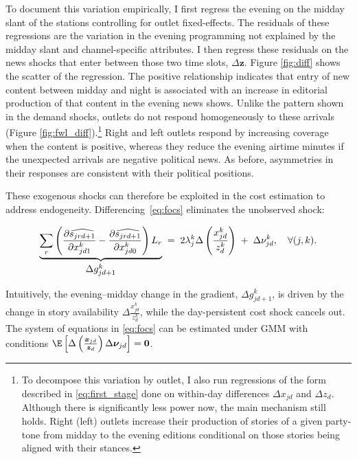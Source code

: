 \documentclass[12pt]{article}
\begin{document}
To document this variation empirically, I first regress the evening on the midday slant of the stations controlling for outlet fixed-effects. The residuals of these regressions are the  variation in the evening programming not explained by the midday slant and channel-specific attributes. I then regress these residuals on the news shocks  that enter between those two time slots, $\Delta \bm{z}$. Figure \ref{fig:diff} shows the scatter of the regression.  The positive relationship indicates that entry of new content between midday and night is associated with an increase in editorial production of that content in the evening news shows. Unlike the pattern shown in the demand shocks,  outlets do not respond homogeneously to these arrivals (Figure \ref{fig:fwl_diff}).\footnote{To decompose this variation by outlet, I also run regressions of the form described in  \eqref{eq:first_stage} done on within-day differences $ \Delta x_{jd}$ and $\Delta z_{d}$. Although there is significantly less power now, the main mechanism still holds. Right (left) outlets increase  their production of stories of a given party-tone from midday to the evening editions conditional on those stories being aligned with their stances.} Right and left  outlets respond by increasing coverage when the content is positive, whereas they reduce the evening airtime minutes if the unexpected arrivals are negative political news. As before, asymmetries in their responses are consistent with their political positions. 


These exogenous shocks can therefore be exploited in the cost estimation to address endogeneity. Differencing~\eqref{eq:focs} eliminates the unobserved shock:

\begin{equation}\label{eq:diff_foc}
	\underbrace{%
		\sum_{r}\left(
		\frac{\partial \widehat{s_{jrd+1}}}{\partial x_{jd1}^k}
		-
		\frac{\partial \widehat{s_{jrd+1}}}{\partial x_{jd0}^k}
		\right)L_r
	}_{\textstyle \Delta g_{jd+1}^k}
	\;=\;
	2\lambda_j^k
\Delta\left( \frac{x_{jd}^k }{z_{d}^k } \right)
	\;+\;
	\Delta\nu_{jd}^k,
	\quad \forall (j,k).
\end{equation}



 Intuitively, the evening–midday change in the gradient, $\Delta g_{jd+1}^k$, is driven by the change in story availability $\Delta	
\frac{x_{jd}^k }{z_{d}^k }$, while the day-persistent cost shock cancels out. The system of equations in \eqref{eq:focs} can be estimated under GMM with conditions $\E \left[\Delta  \left( \frac{\bm{x}_{jd}}{\bm{z}_{d}} \right)  \Delta\bm\nu_{jd} \right]= \bm{0} $. 
\end{document}
